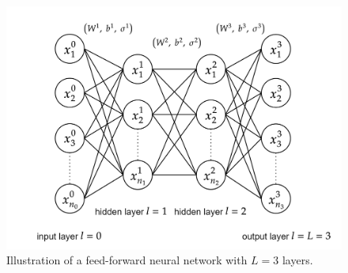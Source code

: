 \begin{figure}[H]
    \begin{center}
        \includegraphics[scale=0.25]{img/diagram-20220206.png}
    \end{center}
    \caption{Illustration of a feed-forward neural network with $L=3$ layers.}
    \label{fig5}
\end{figure}

